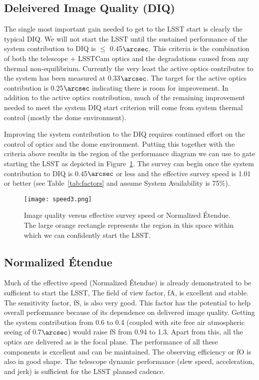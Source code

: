 \subsection{Deleivered Image Quality (DIQ)}

The single most important gain needed to get to the LSST start is clearly the typical DIQ.  We will not start the LSST until the sustained performance of the system contribution to DIQ is $\le$ 0.45$\arcsec$.  This criteria is the combination of both the telescope + LSSTCam optics and the degradations caused from any thermal non-equilibrium. Currently the very least the active optics contributes to the system has been measured at 0.33$\arcsec$.  The target for the active optics contribution is 0.25$\arcsec$ indicating there is room for improvement.  In addition to the active optics contribution, much of the remaining improvement needed to meet the system DIQ start criterion will come from system thermal control (mostly the dome environment).

Improving the system contribution to the DIQ requires continued effort on the control of optics and the dome environment. Putting this together with the criteria above results in the region of the performance diagram we can use to gate starting the LSST as depicted in Figure~\ref{speed3}. The survey can begin once the system contribution to DIQ is 0.45$\arcsec$ or less and the effective survey speed is 1.01 or better (see Table~\ref{tab:factors} and assume System Availability is 75$\%$).

\begin{figure}[t]
\centering
\texttt{[image: speed3.png]}
\caption{Image quality versus effective survey speed or Normalized \'{E}tendue. The large orange rectangle represents the region in this space within which we can confidently start the LSST.}
\label{speed3}
\end{figure}

\subsection{Normalized \'{E}tendue}
Much of the effective speed (Normalized  \'{E}tendue) is already demonstrated to be sufficient to start the LSST, The field of view factor, fA, is excellent and stable. The sensitivity factor, fS, is also very good. This factor has the potential to help overall performance because of its dependence on delivered image quality. Getting the system contribution from 0.6 to 0.4 (coupled with site free air atmospheric seeing of 0.7$\arcsec$) would raise fS from 0.94 to 1.3. Apart from this, all the optics are delivered as is the focal plane. The performance of all these components is excellent and can be maintained. The observing efficiency or fO is also in good shape. The telescope dynamic performance (slew speed, acceleration, and jerk) is sufficient for the LSST planned cadence. 

